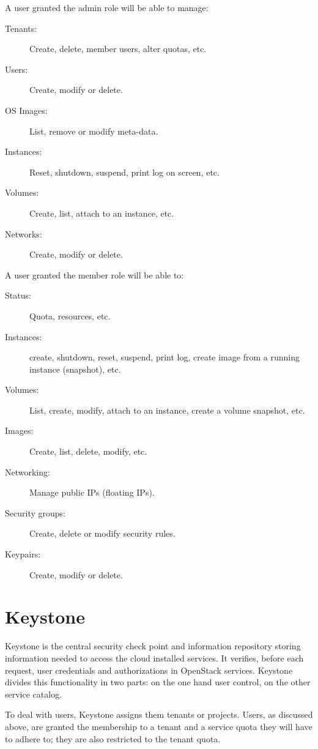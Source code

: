 A user granted the admin role will be able to manage:

\begin{description}
 \item[Tenants:] Create, delete, member users, alter quotas, etc.
 \item[Users:] Create, modify or delete.
 \item[OS Images:] List, remove or modify meta-data.
 \item[Instances:] Reset, shutdown, suspend, print log on screen, etc.
 \item[Volumes:] Create, list, attach to an instance, etc.
 \item[Networks:] Create, modify or delete.
\end{description}

A user granted the member role will be able to:

\begin{description}
 \item[Status:] Quota, resources, etc.
 \item[Instances:] create, shutdown, reset, suspend, print log, create image from a running instance (snapshot), etc.
 \item[Volumes:] List, create, modify, attach to an instance, create a volume snapshot, etc.
 \item[Images:] Create, list, delete, modify, etc.
 \item[Networking:] Manage public IPs (floating IPs).
 \item[Security groups:] Create, delete or modify security rules.
 \item[Keypairs:] Create, modify or delete.
\end{description}

\section{Keystone}\label{sec:keystone}

\noindent Keystone is the central security check point and information repository storing information needed to access the cloud installed services. It verifies, before each request, user credentials and authorizations in OpenStack services. Keystone divides this functionality in two parts: on the one hand user control, on the other service catalog.

To deal with users, Keystone assigns them tenants or projects. Users, as discussed above, are granted the membership to a tenant and a service quota they will have to adhere to; they are also restricted to the tenant quota.

